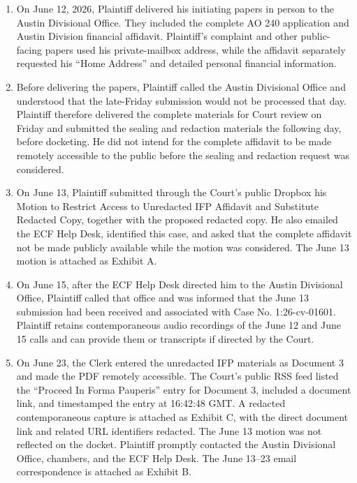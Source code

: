 \documentclass[12pt]{article}
\renewcommand{\FilingCivilActionNumber}{1:26-cv-01601}
\begin{document}
\begin{enumerate}
\item On June 12, 2026, Plaintiff delivered his initiating papers in person to the Austin Divisional Office. They included the complete AO 240 application and Austin Division financial affidavit. Plaintiff's complaint and other public-facing papers used his private-mailbox address, while the affidavit separately requested his ``Home Address'' and detailed personal financial information.

\item Before delivering the papers, Plaintiff called the Austin Divisional Office and understood that the late-Friday submission would not be processed that day. Plaintiff therefore delivered the complete materials for Court review on Friday and submitted the sealing and redaction materials the following day, before docketing. He did not intend for the complete affidavit to be made remotely accessible to the public before the sealing and redaction request was considered.

\item On June 13, Plaintiff submitted through the Court's public Dropbox his Motion to Restrict Access to Unredacted IFP Affidavit and Substitute Redacted Copy, together with the proposed redacted copy. He also emailed the ECF Help Desk, identified this case, and asked that the complete affidavit not be made publicly available while the motion was considered. The June 13 motion is attached as Exhibit A.

\item On June 15, after the ECF Help Desk directed him to the Austin Divisional Office, Plaintiff called that office and was informed that the June 13 submission had been received and associated with Case No. \FilingCivilActionNumber. Plaintiff retains contemporaneous audio recordings of the June 12 and June 15 calls and can provide them or transcripts if directed by the Court.

\item On June 23, the Clerk entered the unredacted IFP materials as Document 3 and made the PDF remotely accessible. The Court's public RSS feed listed the ``Proceed In Forma Pauperis'' entry for Document 3, included a document link, and timestamped the entry at 16:42:48 GMT. A redacted contemporaneous capture is attached as Exhibit C, with the direct document link and related URL identifiers redacted. The June 13 motion was not reflected on the docket. Plaintiff promptly contacted the Austin Divisional Office, chambers, and the ECF Help Desk. The June 13--23 email correspondence is attached as Exhibit B.


\end{enumerate}
\end{document}
